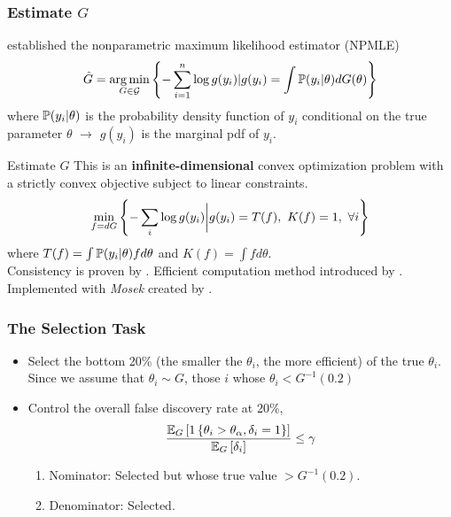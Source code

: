 \documentclass[10pt,mathserif,aspectratio=169]{beamer}
\begin{document}
\begin{frame}[fragile]
  \frametitle{Estimate $G$}
  \citet{kiefer1956consistency} established the nonparametric maximum likelihood estimator (NPMLE)
  \begin{equation*}
    \hat{G}=\operatorname*{arg\,min}_{G\in \mathcal{G}} \left\{-\sum_{i=1}^{n}\log g(y_i)|g(y_i)=\int  \mathbb{P}(y_i |\theta)dG(\theta) \right\}
  \end{equation*}
  where $\mathbb{P}(y_i |\theta)$ is the probability density function of $y_i$ conditional on the true parameter $\theta$ $\longrightarrow$ $g(y_i)$ is the marginal pdf of $y_i$.
\end{frame}

\begin{frame}{Estimate $G$}
  This is an \textbf{infinite-dimensional} convex optimization problem with a strictly convex objective subject to linear constraints.
  \begin{equation*}
    \min_{f=dG}\left\{-\sum_i \log g(y_i)\bigg |g(y_i) = T(f),\ K(f)=1,\ \forall i \right\}
  \end{equation*}
  where $ T(f)=\int \mathbb{P}(y_i |\theta)f d\theta $ and  $K(f)= \int f d\theta$.\\

  Consistency is proven by \citet{kiefer1956consistency}. Efficient computation
  method introduced by \citet{koenker2014convex}. Implemented with \textit{Mosek}
  created by \citet{andersen2010mosek}.
\end{frame}

\begin{frame}
  \frametitle{The Selection Task}
  \begin{itemize}\itemsep=12pt
    \item Select the bottom 20\% (the smaller the $\theta_i$, the more efficient) of the
          true $\theta_i$. Since we assume that $\theta_i \sim G$, those $i$ whose
          $\theta_i<G^{-1}(0.2)$
    \item Control the overall false discovery rate at 20\%,
          \begin{equation*}
            \frac{\mathbb{E}_G\left[1\left\{\theta_i>\theta_{\alpha},\delta_i=1\right\}\right]}{\mathbb{E}_G\left[\delta_i\right]} \le \gamma
          \end{equation*}
          \begin{enumerate}
            \item Nominator: Selected but whose true value $>G^{-1}(0.2)$.
            \item Denominator: Selected.
          \end{enumerate}
  \end{itemize}
\end{frame}
\end{document}
